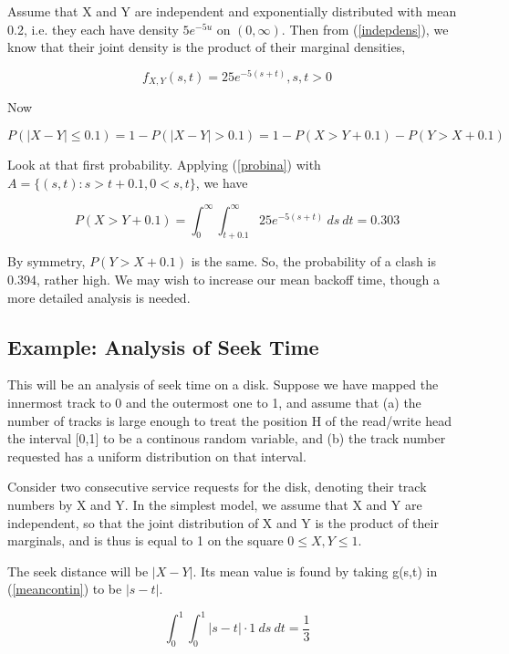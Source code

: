 Assume that X and Y are independent and exponentially distributed with
mean 0.2, i.e. they each have density $5e^{-5u}$ on $(0,\infty)$.
Then from (\ref{indepdens}), we know that their joint density
is the product of their marginal densities, 

\begin{equation}
f_{X,Y}(s,t) = 25 e^{-5(s+t)}, s,t > 0
\end{equation}

Now

\begin{equation}
P(|X - Y| \leq 0.1) = 1 - P(|X - Y| > 0.1)
= 1 - P(X > Y + 0.1) - P(Y > X + 0.1) 
\end{equation}

Look at that first probability.  Applying (\ref{probina}) with $A =
\{(s,t): s > t + 0.1, 0 < s,t\}$, we have

\begin{equation}
P(X > Y + 0.1) =
\int_{0}^{\infty} \int_{t+0.1}^{\infty} 25 e^{-5(s+t)} ~ ds ~ dt = 0.303
\end{equation}

By symmetry, $P(Y > X + 0.1)$ is the same.  So, the probability of a
clash is 0.394, rather high.  We may wish to increase our mean backoff
time, though a more detailed analysis is needed.

\subsection{Example:  Analysis of Seek Time}

This will be an analysis of seek time on a disk.  Suppose we have mapped
the innermost track to 0 and the outermost one to 1, and assume that (a)
the number of tracks is large enough to treat the position H of the
read/write head the interval [0,1] to be a continous random variable,
and (b) the track number requested has a uniform distribution on that
interval.

Consider two consecutive service requests for the disk, denoting their
track numbers by X and Y.  In the simplest model, we assume that X and Y
are independent, so that  the joint distribution of X and Y is the
product of their marginals, and is thus is equal to 1 on the square $0
\leq X,Y \leq 1$.

The seek distance will be $|X-Y|$.  Its mean value is found by taking
g(s,t) in (\ref{meancontin}) to be $|s-t|$.

\begin{equation}
\int_{0}^{1} \int_{0}^{1} |s-t| \cdot 1 ~ ds ~ dt = \frac{1}{3}
\end{equation}

